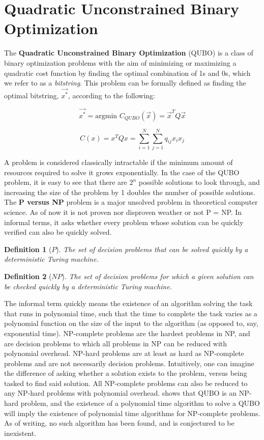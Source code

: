 \documentclass[12pt,a4paper]{report}
\newtheorem{definition}{Definition}
\begin{document}
\section{Quadratic Unconstrained Binary Optimization}

\noindent
The \textbf{Quadratic Unconstrained Binary Optimization} (QUBO) is a class of binary optimization problems with the aim of minimizing or maximizing a quadratic cost function by finding the optimal combination of 1s and 0s, which we refer to as a \textit{bitstring}. This problem can be formally defined as finding the optimal bitstring, $\vec{x^*}$, according to the following:

\[
\vec{x^*} = \text{argmin } C_{QUBO}(\vec{x}) = \vec{x}^T Q \vec{x}
\]

\[
C(x) = x^T Q x = \sum_{i=1}^{N} \sum_{j=1}^{N} q_{ij} x_i x_j
\]

\noindent
A problem is considered classically intractable if the minimum amount of resources required to solve it grows exponentially. In the case of the QUBO problem, it is easy to see that there are \(2^n\) possible solutions to look through, and increasing the size of the problem by 1 doubles the number of possible solutions. The \textbf{P versus NP} problem is a major unsolved problem in theoretical computer science. As of now it is not proven nor disproven weather or not P = NP. In informal terms, it asks whether every problem whose solution can be quickly verified can also be quickly solved.

\begin{definition}[\(P\)]
  The set of decision problems that can be solved quickly by a deterministic Turing machine.
\end{definition}

\begin{definition}[\(NP\)]
  The set of decision problems for which a given solution can be checked quickly by a deterministic Turing machine.
\end{definition}

\noindent
The informal term quickly means the existence of an algorithm solving the task that runs in polynomial time, such that the time to complete the task varies as a polynomial function on the size of the input to the algorithm (as opposed to, say, exponential time). NP-complete problems are the hardest problems in NP, and are decision problems to which all problems in NP can be reduced with polynomial overhead. NP-hard problems are at least as hard as NP-complete problems and are not necessarily decision problems. Intuitively, one can imagine the difference of asking whether a solution exists to the problem, versus being tasked to find said solution. All NP-complete problems can also be reduced to any NP-hard problems with polynomial overhead. \cite{QUBO_NP} shows that QUBO is an NP-hard problem, and the existence of a polynomial time algorithm to solve a QUBO will imply the existence of polynomial time algorithms for NP-complete problems. As of writing, no such algorithm has been found, and is conjectured to be inexistent.
\\
\end{document}
